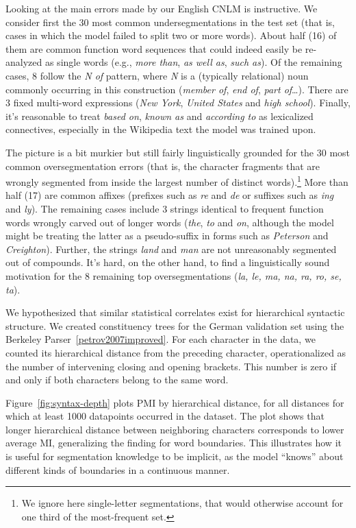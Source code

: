 Looking at the main errors made by our English CNLM is instructive. We
consider first the 30 most common undersegmentations in the test set
(that is, cases in which the model failed to split two or more
words). About half (16) of them are common function word sequences
that could indeed easily be re-analyzed as single words (e.g.,
\emph{more than}, \emph{as well as}, \emph{such as}). Of the remaining
cases, 8 follow the \emph{N of} pattern, where \emph{N} is a
(typically relational) noun commonly occurring in this construction
(\emph{member of}, \emph{end of}, \emph{part of}\ldots). There are 3
fixed multi-word expressions (\emph{New York}, \emph{United States}
and \emph{high school}). Finally, it's reasonable to treat \emph{based
  on}, \emph{known as} and \emph{according to} as lexicalized
connectives, especially in the Wikipedia text the model was trained
upon.

The picture is a bit murkier but still fairly linguistically grounded
for the 30 most common oversegmentation errors (that is, the character
fragments that are wrongly segmented from inside the largest number of
distinct words).\footnote{We ignore here single-letter segmentations,
  that would otherwise account for one third of the most-frequent
  set.}  More than half (17) are common affixes (prefixes such as
\emph{re} and \emph{de} or suffixes such as \emph{ing} and
\emph{ly}). The remaining cases include 3 strings identical to frequent
function words wrongly carved out of longer words (\emph{the},
\emph{to} and \emph{on}, although the model might be treating the
latter as a pseudo-suffix in forms such as \emph{Peterson} and
\emph{Creighton}). Further, the strings \emph{land} and \emph{man} are not
unreasonably segmented out of compounds. It's hard, on the other hand,
to find a linguistically sound motivation for the 8 remaining top
oversegmentations (\emph{la, le, ma, na, ra, ro, se, ta}).

We hypothesized that similar statistical correlates exist for hierarchical syntactic structure.
We created constituency trees for the German validation set using the Berkeley Parser~\ref{petrov2007improved}.
For each character in the data, we counted its hierarchical distance from the preceding character, operationalized as the number of intervening closing and opening brackets.
This number is zero if and only if both characters belong to the same word.

Figure~\ref{fig:syntax-depth} plots PMI by hierarchical distance, for all distances for which at least 1000 datapoints occurred in the dataset.
The plot shows that longer hierarchical distance between neighboring characters corresponds to lower average MI, generalizing the finding for word boundaries.
This illustrates how it is useful for segmentation knowledge to be implicit, as the model ``knows'' about different kinds of boundaries in a continuous manner.

